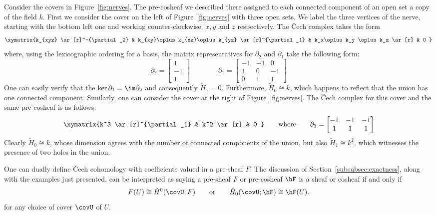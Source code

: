 \begin{ex}
	Consider the covers in Figure~\ref{fig:nerves}. The pre-cosheaf we described there assigned to each connected component of an open set a copy of the field $k$. First we consider the cover on the left of Figure~\ref{fig:nerves} with three open sets. We label the three vertices of the nerve, starting with the bottom left one and working counter-clockwise, $x,y$ and $z$ respectively. The \v{C}ech complex takes the form
	\[
		\xymatrix{k_{xyz} \ar[r]^-{\partial_2} & k_{xy}\oplus k_{xz}\oplus k_{yz} \ar[r]^{\partial_1} & k_x\oplus k_y \oplus k_z \ar[r] & 0 }
	\]
	where, using the lexicographic ordering for a basis, the matrix representatives for $\partial_2$ and $\partial_1$ take the following form:
	\[
		\partial_2=\begin{bmatrix} 1 \\ -1 \\ 1\end{bmatrix} \qquad \qquad  \partial_1=\begin{bmatrix} -1 & -1 & 0 \\ 1 & 0 & -1 \\ 0 & 1 & 1\end{bmatrix}
	\]
	One can easily verify that the $\ker \partial_1=\im \partial_2$ and consequently $\check{H}_1=0$. Furthermore, $\check{H}_0\cong k$, which happens to reflect that the union has one connected component.
	Similarly, one can consider the cover at the right of Figure~\ref{fig:nerves}. The \v{C}ech complex for this cover and the same pre-cosheaf is as follows:
	\[
		\xymatrix{k^3 \ar[r]^{\partial_1} & k^2 \ar[r] & 0 } \qquad \mathrm{where} \qquad \partial_1=\begin{bmatrix} -1 & -1 & -1 \\ 1& 1 & 1\end{bmatrix}
	\]
	Clearly $\check{H}_0\cong k$, whose dimension agrees with the number of connected components of the union, but also $\check{H}_1\cong k^2$, which witnesses the presence of two holes in the union.
\end{ex}

One can dually define \v{C}ech cohomology with coefficients valued in a pre-sheaf $F$. The discussion of Section~\ref{subsubsec:exactness}, along with the examples just presented, can be interpreted as saying a pre-sheaf $F$ or pre-cosheaf $\hF$ is a sheaf or cosheaf if and only if
	\[
	F(U)\cong \check{H}^0(\covU;F) \qquad \mathrm{or} \qquad \check{H}_0(\covU;\hF)\cong \hF(U).
	\]
for any choice of cover $\covU$ of $U$.
	
